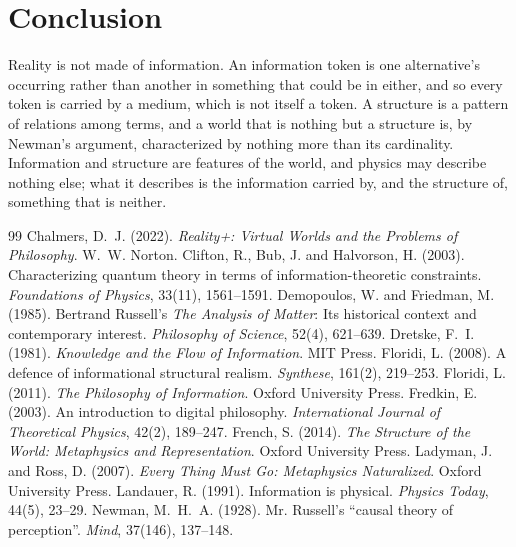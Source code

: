 \documentclass{situationist-preprint}
\begin{document}
\section{Conclusion}

Reality is not made of information. An information token is one alternative's occurring rather than another in something that could be in either, and so every token is carried by a medium, which is not itself a token. A structure is a pattern of relations among terms, and a world that is nothing but a structure is, by Newman's argument, characterized by nothing more than its cardinality. Information and structure are features of the world, and physics may describe nothing else; what it describes is the information carried by, and the structure of, something that is neither.

\begin{thebibliography}{99}\small
{} Chalmers, D.~J. (2022). \emph{Reality+: Virtual Worlds and the Problems of Philosophy}. W.~W. Norton.
 Clifton, R., Bub, J. and Halvorson, H. (2003). Characterizing quantum theory in terms of information-theoretic constraints. \emph{Foundations of Physics}, 33(11), 1561--1591.
 Demopoulos, W. and Friedman, M. (1985). Bertrand Russell's \emph{The Analysis of Matter}: Its historical context and contemporary interest. \emph{Philosophy of Science}, 52(4), 621--639.
 Dretske, F.~I. (1981). \emph{Knowledge and the Flow of Information}. MIT Press.
 Floridi, L. (2008). A defence of informational structural realism. \emph{Synthese}, 161(2), 219--253.
 Floridi, L. (2011). \emph{The Philosophy of Information}. Oxford University Press.
 Fredkin, E. (2003). An introduction to digital philosophy. \emph{International Journal of Theoretical Physics}, 42(2), 189--247.
 French, S. (2014). \emph{The Structure of the World: Metaphysics and Representation}. Oxford University Press.
 Ladyman, J. and Ross, D. (2007). \emph{Every Thing Must Go: Metaphysics Naturalized}. Oxford University Press.
 Landauer, R. (1991). Information is physical. \emph{Physics Today}, 44(5), 23--29.
 Newman, M.~H.~A. (1928). Mr. Russell's \enquote{causal theory of perception}. \emph{Mind}, 37(146), 137--148.

\end{thebibliography}
\end{document}
